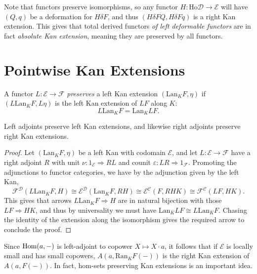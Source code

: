 Note that functors preserve isomorphisms, so any functor $H : \mathrm{Ho} \mathcal{D}  \to \mathcal{E} $ will have $(Q,q)$ be a deformation for $H\delta F$, and thus $(H\delta FQ,H\delta Fq)$ is a right Kan extension. This gives that total derived functors \emph{of left deformable functors} are in fact \emph{absolute Kan extension}, meaning they are preserved by all functors.

\section{Pointwise Kan Extensions}

\begin{definition}\label{dfn:10.5}
	A functor $L : \mathcal{E}  \to \mathcal{F} $ \emph{preserves} a left Kan extension $(\mathrm{Lan} _KF,\eta)$ if $(L\mathrm{Lan} _KF,L\eta)$ is the left Kan extension of $LF$ along $K$:
	\[
		L\mathrm{Lan} _KF=\mathrm{Lan} _KLF
	.\]
\end{definition}

\begin{lemma}\label{lma:10.2}
	Left adjoints preserve left Kan extensions, and likewise right adjoints preserve right Kan extensions.
\end{lemma}
\begin{proof}
	Let $(\mathrm{Lan} _KF,\eta)$ be a left Kan with codomain $\mathcal{E} $, and let $L : \mathcal{E}  \to \mathcal{F} $ have a right adjoint $R$ with unit $\nu : 1_\mathcal{E}  \Rightarrow RL$ and counit $\varepsilon : LR \Rightarrow 1_\mathcal{F} $. Promoting the adjunctions to functor categories, we have by the adjunction given by the left Kan,
	\[
		\mathcal{F} ^{\mathcal{D} } (L\mathrm{Lan}_KF,H)\cong \mathcal{E} ^{\mathcal{D} } (\mathrm{Lan} _KF,RH)\cong \mathcal{E} ^{\mathcal{C}} (F,RHK)\cong \mathcal{F} ^{\mathcal{C}} (LF,HK)
	.\]
	This gives that arrows $L\mathrm{Lan} _KF\Rightarrow H$ are in natural bijection with those $LF\Rightarrow HK$, and thus by universality we must have $\mathrm{Lan} _K LF \cong L\mathrm{Lan} _KF$. Chasing the identity of the extension along the isomorphism gives the required arrow to conclude the proof.
\end{proof}

Since $\operatorname{Hom}(a, -) $ is left-adjoint to copower $X\mapsto X\cdot a$, it follows that if $\mathcal{E} $ is locally small and has small copowers, $A(a,\mathrm{Ran}_KF(-))$ is the right Kan extension of $A(a,F(-))$. In fact, hom-sets preserving Kan extensions is an important idea.

